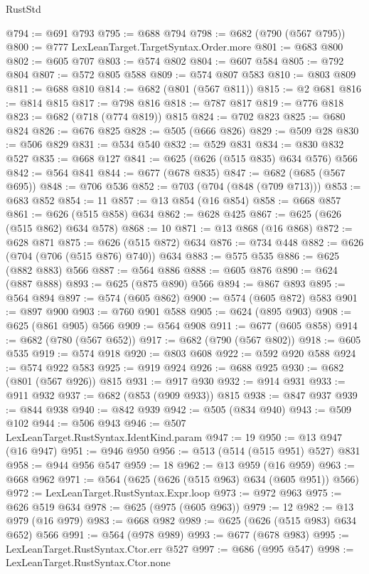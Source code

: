 \begin{lexlean}{RustStd}
\begin{coremodule}
@794 := @691 @793
@795 := @688 @794
@798 := @682 (@790 (@567 @795))
@800 := @777 LexLeanTarget.TargetSyntax.Order.more
@801 := @683 @800
@802 := @605 @707
@803 := @574 @802
@804 := @607 @584
@805 := @792 @804
@807 := @572 @805 @588
@809 := @574 @807 @583
@810 := @803 @809
@811 := @688 @810
@814 := @682 (@801 (@567 @811))
@815 := @2 @681
@816 := @814 @815
@817 := @798 @816
@818 := @787 @817
@819 := @776 @818
@823 := @682 (@718 (@774 @819)) @815
@824 := @702 @823
@825 := @680 @824
@826 := @676 @825
@828 := @505 (@666 @826)
@829 := @509 @28
@830 := @506 @829
@831 := @534 @540
@832 := @529 @831
@834 := @830 @832 @527
@835 := @668 @127
@841 := @625 (@626 (@515 @835) @634 @576) @566
@842 := @564 @841
@844 := @677 (@678 @835)
@847 := @682 (@685 (@567 @695))
@848 := @706 @536
@852 := @703 (@704 (@848 (@709 @713)))
@853 := @683 @852
@854 := 11
@857 := @13 @854 (@16 @854)
@858 := @668 @857
@861 := @626 (@515 @858) @634
@862 := @628 @425
@867 := @625 (@626 (@515 @862) @634 @578)
@868 := 10
@871 := @13 @868 (@16 @868)
@872 := @628 @871
@875 := @626 (@515 @872) @634
@876 := @734 @448
@882 := @626 (@704 (@706 (@515 @876) @740)) @634
@883 := @575 @535
@886 := @625 (@882 @883) @566
@887 := @564 @886
@888 := @605 @876
@890 := @624 (@887 @888)
@893 := @625 (@875 @890) @566
@894 := @867 @893
@895 := @564 @894
@897 := @574 (@605 @862)
@900 := @574 (@605 @872) @583
@901 := @897 @900
@903 := @760 @901 @588
@905 := @624 (@895 @903)
@908 := @625 (@861 @905) @566
@909 := @564 @908
@911 := @677 (@605 @858)
@914 := @682 (@780 (@567 @652))
@917 := @682 (@790 (@567 @802))
@918 := @605 @535
@919 := @574 @918
@920 := @803 @608
@922 := @592 @920 @588
@924 := @574 @922 @583
@925 := @919 @924
@926 := @688 @925
@930 := @682 (@801 (@567 @926)) @815
@931 := @917 @930
@932 := @914 @931
@933 := @911 @932
@937 := @682 (@853 (@909 @933)) @815
@938 := @847 @937
@939 := @844 @938
@940 := @842 @939
@942 := @505 (@834 @940)
@943 := @509 @102
@944 := @506 @943
@946 := @507 LexLeanTarget.RustSyntax.IdentKind.param
@947 := 19
@950 := @13 @947 (@16 @947)
@951 := @946 @950
@956 := @513 (@514 (@515 @951) @527) @831
@958 := @944 @956 @547
@959 := 18
@962 := @13 @959 (@16 @959)
@963 := @668 @962
@971 := @564 (@625 (@626 (@515 @963) @634 (@605 @951)) @566)
@972 := LexLeanTarget.RustSyntax.Expr.loop
@973 := @972 @963
@975 := @626 @519 @634
@978 := @625 (@975 (@605 @963))
@979 := 12
@982 := @13 @979 (@16 @979)
@983 := @668 @982
@989 := @625 (@626 (@515 @983) @634 @652) @566
@991 := @564 (@978 @989)
@993 := @677 (@678 @983)
@995 := LexLeanTarget.RustSyntax.Ctor.err @527
@997 := @686 (@995 @547)
@998 := LexLeanTarget.RustSyntax.Ctor.none

\end{coremodule}
\end{lexlean}
